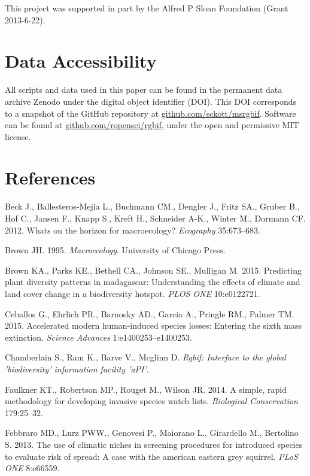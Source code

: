 \documentclass[author-year, review, 11pt]{components/elsarticle} %
\begin{document}
This project was supported in part by the Alfred P Sloan Foundation
(Grant 2013-6-22).

\section{Data Accessibility}\label{data-accessibility}

All scripts and data used in this paper can be found in the permanent
data archive Zenodo under the digital object identifier (DOI). This DOI
corresponds to a snapshot of the GitHub repository at
\href{https://github.com/sckott/msrgbif}{github.com/sckott/msrgbif}.
Software can be found at
\href{https://github.com/ropensci/rgbif}{github.com/ropensci/rgbif},
under the open and permissive MIT license.

\section*{References}\label{references}

Beck J., Ballesteros-Mejia L., Buchmann CM., Dengler J., Fritz SA.,
Gruber B., Hof C., Jansen F., Knapp S., Kreft H., Schneider A-K., Winter
M., Dormann CF. 2012. Whats on the horizon for macroecology?
\emph{Ecography} 35:673--683.

Brown JH. 1995. \emph{Macroecology}. University of Chicago Press.

Brown KA., Parks KE., Bethell CA., Johnson SE., Mulligan M. 2015.
Predicting plant diversity patterns in madagascar: Understanding the
effects of climate and land cover change in a biodiversity hotspot.
\emph{PLOS ONE} 10:e0122721.

Ceballos G., Ehrlich PR., Barnosky AD., Garcia A., Pringle RM., Palmer
TM. 2015. Accelerated modern human-induced species losses: Entering the
sixth mass extinction. \emph{Science Advances} 1:e1400253--e1400253.

Chamberlain S., Ram K., Barve V., Mcglinn D. \emph{Rgbif: Interface to
the global 'biodiversity' information facility 'aPI'}.

Faulkner KT., Robertson MP., Rouget M., Wilson JR. 2014. A simple, rapid
methodology for developing invasive species watch lists.
\emph{Biological Conservation} 179:25--32.

Febbraro MD., Lurz PWW., Genovesi P., Maiorano L., Girardello M.,
Bertolino S. 2013. The use of climatic niches in screening procedures
for introduced species to evaluate risk of spread: A case with the
american eastern grey squirrel. \emph{PLoS ONE} 8:e66559.
\end{document}
